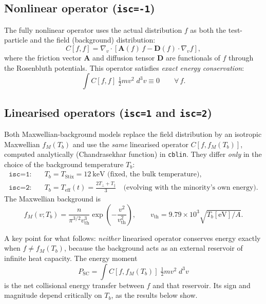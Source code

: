 \documentclass[11pt,a4paper]{article}
\begin{document}
\subsection{Nonlinear operator (\texttt{isc=-1})}

The fully nonlinear operator uses the actual distribution $f$ as both the
test-particle and the field (background) distribution:
\begin{equation}
  C[f,f] = \nabla_v \cdot
    \left[ \mathbf{A}(f)\,f - \mathbf{D}(f)\cdot\nabla_v f \right],
\end{equation}
where the friction vector $\mathbf{A}$ and diffusion tensor $\mathbf{D}$ are
functionals of $f$ through the Rosenbluth potentials. This operator satisfies
\emph{exact energy conservation}:
\begin{equation}
  \int C[f,f]\;\tfrac{1}{2}m v^2\; d^3v \equiv 0 \qquad \forall\, f.
\end{equation}

\subsection{Linearised operators (\texttt{isc=1} and \texttt{isc=2})}

Both Maxwellian-background models replace the field distribution by an
isotropic Maxwellian $f_M(T_b)$ and use the \emph{same} linearised operator
$C[f, f_M(T_b)]$, computed analytically (Chandrasekhar function) in
\texttt{cblin}. They differ \emph{only} in the choice of the background
temperature $T_b$:
\begin{align}
  \texttt{isc=1}:&\quad T_b = T_\text{Stix} = 12~\text{keV (fixed, the bulk
    temperature)},\\
  \texttt{isc=2}:&\quad T_b = T_\text{eff}(t) = \frac{2T_\perp + T_\parallel}{3}
    \quad\text{(evolving with the minority's own energy)}.
\end{align}
The Maxwellian background is
\begin{equation}
  f_M(v; T_b) = \frac{n}{\pi^{3/2} v_\text{th}^3}
    \exp\!\left(-\frac{v^2}{v_\text{th}^2}\right),
  \qquad
  v_\text{th} = 9.79\times10^3\sqrt{T_b[\text{eV}]/A}.
\end{equation}

A key point for what follows: \emph{neither} linearised operator conserves
energy exactly when $f \neq f_M(T_b)$, because the background acts as an
external reservoir of infinite heat capacity. The energy moment
\begin{equation}
  P_\text{SC} = \int C[f, f_M(T_b)]\;\tfrac{1}{2}mv^2\;d^3v
  \label{eq:psc}
\end{equation}
is the net collisional energy transfer between $f$ and that reservoir. Its
sign and magnitude depend critically on $T_b$, as the results below show.
\end{document}
